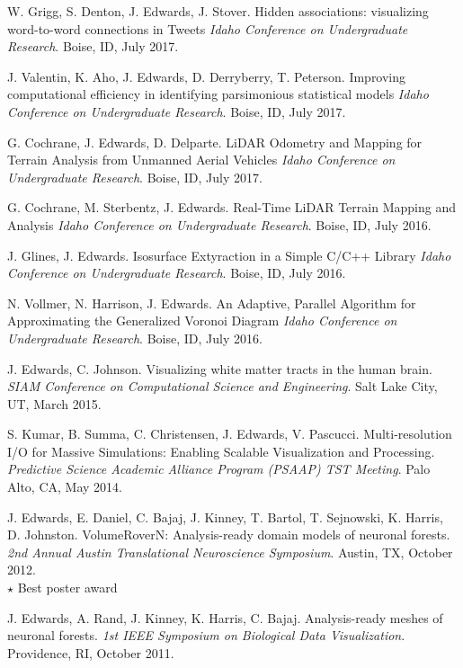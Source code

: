 \documentclass[margin,line]{res}
\begin{document}
\begin{resume}
\begin{LONG}
W. Grigg, S. Denton, J. Edwards, J. Stover.
Hidden associations: visualizing word-to-word connections in Tweets
\textit{Idaho Conference on Undergraduate Research}. Boise, ID, July 2017.

J. Valentin, K. Aho, J. Edwards, D. Derryberry, T. Peterson.
Improving computational efficiency in identifying parsimonious statistical models
\textit{Idaho Conference on Undergraduate Research}. Boise, ID, July 2017.

G. Cochrane, J. Edwards, D. Delparte.
LiDAR Odometry and Mapping for Terrain Analysis from Unmanned Aerial Vehicles
\textit{Idaho Conference on Undergraduate Research}. Boise, ID, July 2017.

G. Cochrane, M. Sterbentz, J. Edwards.
Real-Time LiDAR Terrain Mapping and Analysis
\textit{Idaho Conference on Undergraduate Research}. Boise, ID, July 2016.

J. Glines, J. Edwards.
Isosurface Extyraction in a Simple C/C++ Library
\textit{Idaho Conference on Undergraduate Research}. Boise, ID, July 2016.

N. Vollmer, N. Harrison, J. Edwards.
An Adaptive, Parallel Algorithm for Approximating the Generalized Voronoi Diagram
\textit{Idaho Conference on Undergraduate Research}. Boise, ID, July 2016.

J. Edwards, C. Johnson.
Visualizing white matter tracts in the human brain.
\textit{SIAM Conference on Computational Science and Engineering}. Salt Lake City, UT, March 2015.

S. Kumar, B. Summa, C. Christensen, J. Edwards, V. Pascucci.
Multi-resolution I/O for Massive Simulations: Enabling Scalable Visualization and Processing.
\textit{Predictive Science Academic Alliance Program (PSAAP) TST Meeting}. Palo Alto, CA, May 2014.

J. Edwards, E. Daniel, C. Bajaj, J. Kinney, T. Bartol, T. Sejnowski, K. Harris, D. Johnston.
VolumeRoverN: Analysis-ready domain models of neuronal forests.
\textit{2nd Annual Austin Translational Neuroscience Symposium}. Austin, TX, October 2012. \\
$\star$ Best poster award


J. Edwards, A. Rand, J. Kinney, K. Harris, C. Bajaj. 
Analysis-ready meshes of neuronal forests. 
\textit{1st IEEE Symposium on Biological Data Visualization}. Providence, RI, October 2011.


\end{LONG}
\end{resume}
\end{document}
